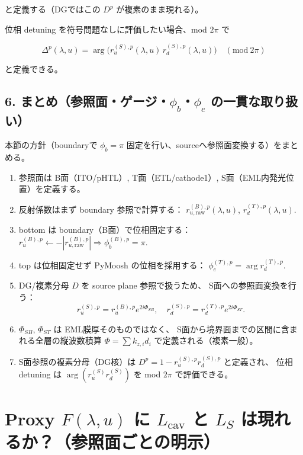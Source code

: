 と定義する（DGではこの \(D^p\) が複素のまま現れる）。

位相 detuning を符号問題なしに評価したい場合、mod \(2\pi\) で

\begin{equation}
\boxed{
\Delta^{p}(\lambda,u)
=
\arg\!\Big(r_u^{(S),p}(\lambda,u)\,r_d^{(S),p}(\lambda,u)\Big)
\quad(\mathrm{mod}\ 2\pi)
}
\end{equation}

と定義できる。

\subsection*{6. まとめ（参照面・ゲージ・\(\phi_b\)・\(\phi_e\) の一貫な取り扱い）}

本節の方針（boundaryで \(\phi_b=\pi\) 固定を行い、sourceへ参照面変換する）をまとめる。

\begin{enumerate}
\item 参照面は B面（ITO/pHTL）, T面（ETL/cathode1）, S面（EML内発光位置）を定義する。
\item 反射係数はまず boundary 参照で計算する：
\(r_{u,\mathrm{raw}}^{(B),p}(\lambda,u)\), \(r_d^{(T),p}(\lambda,u)\).
\item bottom は boundary（B面）で位相固定する：
\(r_u^{(B),p}\leftarrow-|r_{u,\mathrm{raw}}^{(B),p}|\Rightarrow \phi_b^{(B),p}=\pi\).
\item top は位相固定せず PyMoosh の位相を採用する：
\(\phi_e^{(T),p}=\arg r_d^{(T),p}\).
\item DG/複素分母 \(D\) を source plane 参照で扱うため、
S面への参照面変換を行う：
\[
r_u^{(S),p}=r_u^{(B),p}e^{2i\Phi_{SB}},\quad
r_d^{(S),p}=r_d^{(T),p}e^{2i\Phi_{ST}}.
\]
\item \(\Phi_{SB}\), \(\Phi_{ST}\) は EML膜厚そのものではなく、
S面から境界面までの区間に含まれる全層の縦波数積算
\(\Phi=\sum k_{z,i}d_i\) で定義される（複素一般）。
\item S面参照の複素分母（DG核）は
\(D^p=1-r_u^{(S),p}r_d^{(S),p}\) と定義され、
位相 detuning は \(\arg(r_u^{(S)}r_d^{(S)})\) を mod \(2\pi\) で評価できる。
\end{enumerate}


\section*{Proxy \(F(\lambda,u)\) に \(L_{\mathrm{cav}}\) と \(L_S\) は現れるか？（参照面ごとの明示）}

